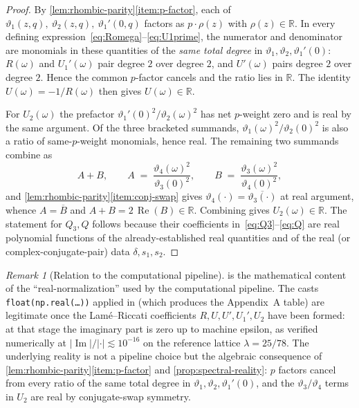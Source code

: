 \documentclass[11pt,a4paper]{article}
\theoremstyle{plain}
\theoremstyle{definition}
\theoremstyle{remark}
\newtheorem{remark}[theorem]{Remark}
\DeclareMathOperator{\Real}{Re}
\DeclareMathOperator{\Imag}{Im}
\newcommand{\vt}[1]{\vartheta_{#1}}     %
\newcommand{\RR}{\mathbb{R}}
\newcommand{\abs}[1]{\lvert #1 \rvert}
\begin{document}
\begin{proof}
By \cref{lem:rhombic-parity}\ref{item:p-factor}, each of
$\vt{1}(z,q),\ \vt{2}(z,q),\ \vt{1}'(0,q)$ factors as $p\cdot\rho(z)$
with $\rho(z) \in \RR$. In every defining
expression~\eqref{eq:Romega}--\eqref{eq:U1prime}, the numerator and
denominator are monomials in these quantities of the \emph{same total
degree} in $\vt{1},\vt{2},\vt{1}'(0)$: $R(\omega)$ and $U_1'(\omega)$
pair degree $2$ over degree $2$, and $U'(\omega)$ pairs degree $2$
over degree $2$.  Hence the common $p$-factor cancels and the ratio
lies in $\RR$.  The identity $U(\omega) = -1/R(\omega)$ then gives
$U(\omega) \in \RR$.

For $U_2(\omega)$ the prefactor $\vt{1}'(0)^2/\vt{2}(\omega)^2$ has
net $p$-weight zero and is real by the same argument.  Of the three
bracketed summands, $\vt{1}(\omega)^2/\vt{2}(0)^2$ is also a ratio of
same-$p$-weight monomials, hence real. The remaining two summands
combine as
\[
  A + B,\qquad
  A \;=\; \frac{\vt{4}(\omega)^2}{\vt{3}(0)^2},\qquad
  B \;=\; \frac{\vt{3}(\omega)^2}{\vt{4}(0)^2},
\]
and \cref{lem:rhombic-parity}\ref{item:conj-swap} gives
$\vt{4}(\cdot) = \overline{\vt{3}(\cdot)}$ at real argument, whence
$A = \overline{B}$ and $A + B = 2\,\Real(B) \in \RR$. Combining gives
$U_2(\omega) \in \RR$. The statement for $Q_3, Q$ follows because
their coefficients in~\eqref{eq:Q3}--\eqref{eq:Q} are real polynomial
functions of the already-established real quantities and of the real
(or complex-conjugate-pair) data $\delta, s_1, s_2$.
\end{proof}

\begin{remark}[Relation to the computational pipeline]
\label{rem:real-normalization}
 is the mathematical content of the
``real-normalization'' used by the computational pipeline. The casts
\texttt{float(np.real(\dots))} applied in
 (which produces the Appendix~A
table) are legitimate once the Lam\'e--Riccati coefficients
$R, U, U', U_1', U_2$ have been formed: at that stage the imaginary
part is zero up to machine epsilon, as verified numerically at
$\abs{\Imag}/\abs{\cdot} \lesssim 10^{-16}$ on the reference lattice
$\lambda = 25/78$. The underlying reality is not a pipeline choice
but the algebraic consequence of
\cref{lem:rhombic-parity}\ref{item:p-factor} and
\cref{prop:spectral-reality}: $p$ factors cancel from every ratio of
the same total degree in $\vt{1},\vt{2},\vt{1}'(0)$, and the
$\vt{3}/\vt{4}$ terms in $U_2$ are real by conjugate-swap symmetry.
\end{remark}
\end{document}
